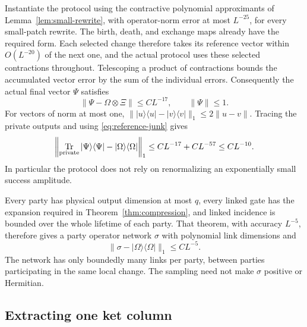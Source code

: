 \documentclass[11pt]{article}
\numberwithin{equation}{section}
\theoremstyle{definition}
\theoremstyle{remark}
\DeclareMathOperator{\Tr}{Tr}
\newcommand{\norm}[1]{\lVert #1\rVert}
\begin{document}
Instantiate the protocol using the contractive polynomial approximants
of Lemma~\ref{lem:small-rewrite}, with operator-norm error at most
$L^{-25}$, for every small-patch rewrite.  The birth, death, and exchange
maps already have the required form.  Each selected change therefore takes
its reference vector within $O(L^{-20})$ of the next one, and the actual
protocol uses these selected contractions throughout.  Telescoping a
product of contractions bounds the accumulated vector error by the sum
of the individual errors. Consequently the actual final vector $\Psi$
satisfies
\[
 \norm{\Psi-\Omega\otimes\Xi}\le CL^{-17},\qquad \norm{\Psi}\le1.
\]
For vectors of norm at most one,
$\norm{|u\rangle\langle u|-|v\rangle\langle v|}_1
\le2\norm{u-v}$. Tracing the private outputs and using
\eqref{eq:reference-junk} gives
\begin{equation}\label{eq:protocol-density}
 \left\|\Tr_{\rm private}|\Psi\rangle\langle\Psi|
             -|\Omega\rangle\langle\Omega|\right\|_1
 \le CL^{-17}+CL^{-57}\le CL^{-10}.
\end{equation}
In particular the protocol does not rely on renormalizing an
exponentially small success amplitude.

Every party has physical output dimension at most $q$, every linked gate
has the expansion required in Theorem~\ref{thm:compression}, and linked
incidence is bounded over the whole lifetime of each party.
That theorem, with accuracy $L^{-5}$, therefore gives a party operator
network $\sigma$ with polynomial link dimensions and
\begin{equation}\label{eq:compressed-density}
 \norm{\sigma-|\Omega\rangle\langle\Omega|}_1\le CL^{-5}.
\end{equation}
The network has only boundedly many links per party, between parties
participating in the same local change. The sampling need not make
$\sigma$ positive or Hermitian.

\subsection{Extracting one ket column}
\end{document}
